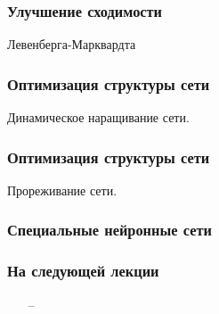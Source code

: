 \documentclass[12pt]{beamer}
\begin{document}
\begin{frame}\frametitle{Улучшение сходимости}
Левенберга-Марквардта
\end{frame}

\begin{frame}\frametitle{Оптимизация структуры сети}
Динамическое наращивание сети.\\

\end{frame}

\begin{frame}\frametitle{Оптимизация структуры сети}
Прореживание сети.\\
\end{frame}


\begin{frame}\frametitle{Специальные нейронные сети}
%
\end{frame}

\begin{frame}\frametitle{На следующей лекции}
\begin{itemize}
\item[--] 
\end{itemize}
\end{frame}
\end{document}
